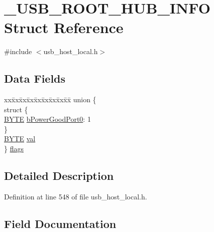 \hypertarget{struct___u_s_b___r_o_o_t___h_u_b___i_n_f_o}{}\section{\+\_\+\+U\+S\+B\+\_\+\+R\+O\+O\+T\+\_\+\+H\+U\+B\+\_\+\+I\+N\+F\+O Struct Reference}
\label{struct___u_s_b___r_o_o_t___h_u_b___i_n_f_o}


{\ttfamily \#include $<$usb\+\_\+host\+\_\+local.\+h$>$}

\subsection*{Data Fields}
\begin{DoxyCompactItemize}
\item 
\begin{tabbing}
xx\=xx\=xx\=xx\=xx\=xx\=xx\=xx\=xx\=\kill
union \{\\
\>struct \{\\
\>\>\hyperlink{_generic_type_defs_8h_a4ae1dab0fb4b072a66584546209e7d58}{BYTE} \hyperlink{struct___u_s_b___r_o_o_t___h_u_b___i_n_f_o_a84ed05a68dfd383840e3db95e968ac3c}{bPowerGoodPort0}: 1\\
\>\} \\
\>\hyperlink{_generic_type_defs_8h_a4ae1dab0fb4b072a66584546209e7d58}{BYTE} \hyperlink{struct___u_s_b___r_o_o_t___h_u_b___i_n_f_o_a5986ea8162aa0f6608b36b20964044dd}{val}\\
\} \hyperlink{struct___u_s_b___r_o_o_t___h_u_b___i_n_f_o_ab8049099997db84d308653c2d6f5730d}{flags}\\

\end{tabbing}\end{DoxyCompactItemize}


\subsection{Detailed Description}


Definition at line 548 of file usb\+\_\+host\+\_\+local.\+h.



\subsection{Field Documentation}
\hypertarget{struct___u_s_b___r_o_o_t___h_u_b___i_n_f_o_a84ed05a68dfd383840e3db95e968ac3c}{}
